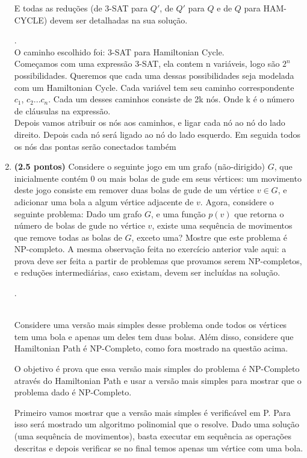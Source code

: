 \documentclass[12pt]{article}
\newcommand{\resposta}[1]{ \noindent {\bf Solução}.{\color{blue} #1}}
\begin{document}
\begin{enumerate}
E todas as reduções (de 3-SAT para $Q'$, de $Q'$ para $Q$ e de $Q$ para HAM-CYCLE) devem ser detalhadas na sua solução.

\resposta{
    \\O caminho escolhido foi: 3-SAT para Hamiltonian Cycle.\\
    Começamos com uma expressão 3-SAT, ela contem n variáveis, logo são $2^n$ possibilidades. Queremos que cada uma dessas possibilidades seja modelada com um Hamiltonian Cycle. Cada variável tem seu caminho correspondente $c_1$, $c_2$...$c_n$. Cada um desses caminhos consiste de 2k nós. Onde k é o número de cláusulas na expressão.\\Depois vamos atribuir os nós aos caminhos, e ligar cada nó ao nó do lado direito. Depois cada nó será ligado ao nó do lado esquerdo. Em seguida todos os nós das pontas serão conectados também 
  }
  
\newpage
\item {\bf (2.5 pontos)} Considere o seguinte jogo em um grafo
  (não-dirigido) $G$, que inicialmente contém 0 ou mais bolas de gude
  em seus vértices: um movimento deste jogo consiste em remover duas
  bolas de gude de um vértice $v\in G$, e adicionar uma bola a algum
  vértice adjacente de $v$. Agora, considere o seguinte problema: Dado
  um grafo $G$, e uma função $p(v)$ que retorna o número de bolas de
  gude no vértice $v$, existe uma sequência de movimentos que remove
  todas as bolas de $G$, exceto uma? Mostre que este problema é
  NP-completo. A mesma observação feita no exercício anterior vale
  aqui: a prova deve ser feita a partir de problemas que provamos
  serem NP-completos, e reduções intermediárias, caso existam, devem
  ser incluídas na solução.

  \resposta{
    \\Considere uma versão mais simples desse problema onde todos os vértices tem uma bola e apenas um deles tem duas bolas. Além disso, considere que Hamiltonian Path é NP-Completo, como fora mostrado na questão acima. 
    
    O objetivo é prova que essa versão mais simples do problema é NP-Completo através do Hamiltonian Path e usar a versão mais simples para mostrar que o problema dado é NP-Completo.
    
    Primeiro vamos mostrar que a versão mais simples é verificável em P. Para isso será mostrado um algoritmo polinomial que o resolve. Dado uma solução (uma sequência de movimentos), basta executar em sequência as operações descritas e depois verificar se no final temos apenas um vértice com uma bola.
    
}
\end{enumerate}
\end{document}
